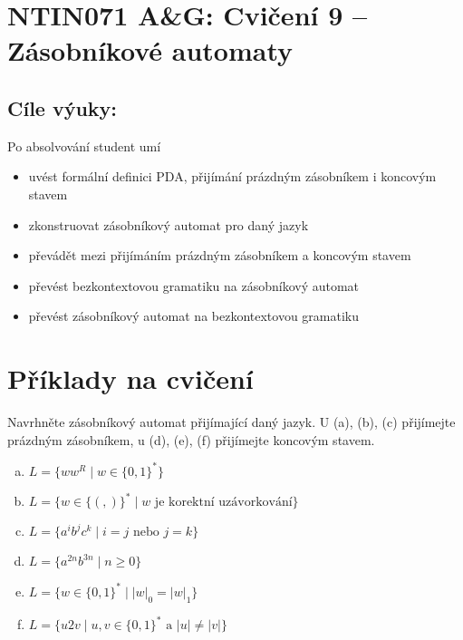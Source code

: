\documentclass[a4paper,12pt]{amsart}
\begin{document}
\thispagestyle{empty}

\section*{NTIN071 A\&G: Cvičení 9 -- Zásobníkové automaty}

\medskip

\subsection*{Cíle výuky:} Po absolvování student umí

\begin{itemize}\setlength{\itemsep}{0pt}
    \item uvést formální definici PDA, přijímání prázdným zásobníkem i koncovým stavem
    \item zkonstruovat zásobníkový automat pro daný jazyk
    \item převádět mezi přijímáním prázdným zásobníkem a koncovým stavem
    \item převést bezkontextovou gramatiku na zásobníkový automat
    \item převést zásobníkový automat na bezkontextovou gramatiku
\end{itemize}

\section*{Příklady na cvičení}

\medskip\begin{problem}\label{problem:construct-pda}

    Navrhněte zásobníkový automat přijímající daný jazyk. U (a), (b), (c) přijímejte prázdným zásobníkem, u (d), (e), (f) přijímejte koncovým stavem.

    \medskip

    \begin{enumerate}[(a)]\setlength\itemsep{6pt}
        \item $L=\{ww^R\mid w\in \{0,1\}^*\}$
        \item $L=\{w\in\{(,)\}^*\mid w\text{ je korektní uzávorkování}\}$
        \item $L=\{a^ib^jc^k\mid i=j \text{ nebo } j=k\} $
        \item $L=\{a^{2n}b^{3n}\mid n\geq 0\}$
        \item $L=\{w\in \{0,1\}^*\mid  |w|_0=|w|_1\} $
        \item $L=\{u2v\mid u,v\in \{0,1\}^*\text{ a }|u|\neq |v|\} $
    \end{enumerate}

\end{problem}
\end{document}
